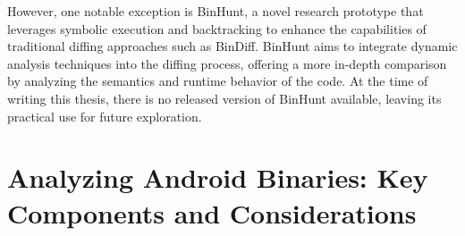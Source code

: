However, one notable exception is BinHunt, a novel research prototype that leverages symbolic execution and backtracking to enhance the capabilities of traditional diffing approaches such as BinDiff. BinHunt aims to integrate dynamic analysis techniques into the diffing process, offering a more in-depth comparison by analyzing the semantics and runtime behavior of the code. At the time of writing this thesis, there is no released version of BinHunt available, leaving its practical use for future exploration.




\section{Analyzing Android Binaries: Key Components and Considerations}
\label{sec:background:android_binaries}

